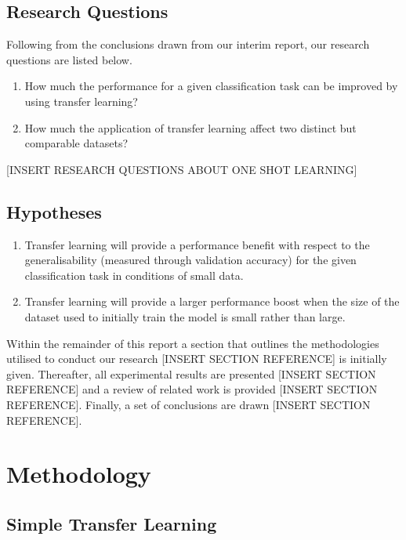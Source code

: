 \documentclass{article}
\begin{document}
\subsection{Research Questions}
\label{sec:questions}
Following from the conclusions drawn from our interim report, our research questions are listed below.

\begin{enumerate}
  \item How much the performance for a given classification task can be improved by using transfer learning?  
  \item How much the application of transfer learning affect two distinct but comparable datasets?
\end{enumerate}

[INSERT RESEARCH QUESTIONS ABOUT ONE SHOT LEARNING]

\subsection{Hypotheses}
\label{sec:hypotheses}
\begin{enumerate}[label=\textbf{H.\arabic*}]
  \item \label{h:1} Transfer learning will provide a performance benefit with respect to the generalisability (measured through validation accuracy) for the given classification task in conditions of small data.
  \item \label{h:2} Transfer learning will provide a larger performance boost when the size of the dataset used to initially train the model is small rather than large.
 \end{enumerate}

Within the remainder of this report a section that outlines the methodologies utilised to conduct our research [INSERT SECTION REFERENCE] is initially given. Thereafter, all experimental results are presented [INSERT SECTION REFERENCE] and a review of related work is provided [INSERT SECTION REFERENCE]. Finally, a set of conclusions are drawn [INSERT SECTION REFERENCE].

\section{Methodology}
\label{sec:methodology}

\subsection{Simple Transfer Learning}
\label{sec:transferlearninng}
\end{document}
